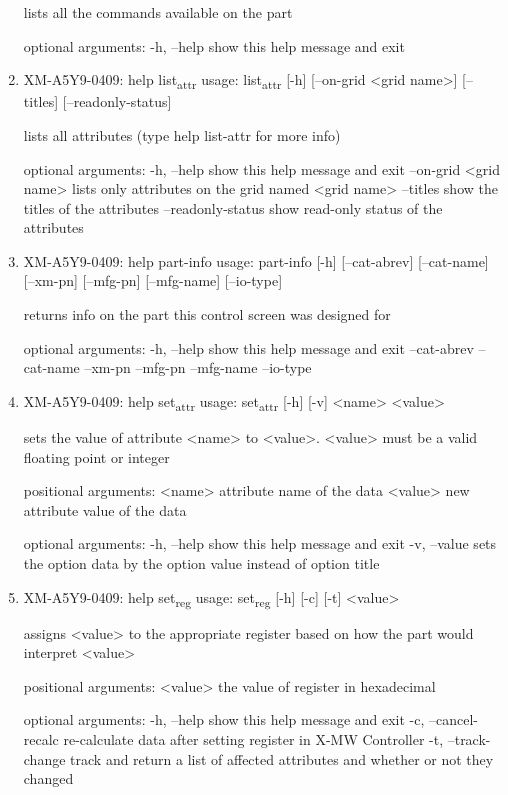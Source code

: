 \documentclass[11pt]{article}
\begin{document}
\begin{enumerate}
lists all the commands available on the part

optional arguments:
  -h, --help  show this help message and exit

\item XM-A5Y9-0409: help list\textsubscript{attr}
\label{sec:org9d9e451}
usage: list\textsubscript{attr} [-h] [--on-grid <grid name>] [--titles] [--readonly-status]

lists all attributes (type help list-attr for more info)

optional arguments:
  -h, --help            show this help message and exit
  --on-grid <grid name>
                        lists only attributes on the grid named <grid name>
  --titles              show the titles of the attributes
  --readonly-status     show read-only status of the attributes

\item XM-A5Y9-0409: help part-info
\label{sec:org0542f0c}
usage: part-info  [-h] [--cat-abrev] [--cat-name] [--xm-pn] [--mfg-pn] [--mfg-name]
        [--io-type]

returns info on the part this control screen was designed for

optional arguments:
  -h, --help   show this help message and exit
  --cat-abrev
  --cat-name
  --xm-pn
  --mfg-pn
  --mfg-name
  --io-type

\item XM-A5Y9-0409: help set\textsubscript{attr}
\label{sec:org537e80b}
usage: set\textsubscript{attr} [-h] [-v] <name> <value>

sets the value of attribute <name> to <value>. <value> must be a valid
floating point or integer

positional arguments:
  <name>       attribute name of the data
  <value>      new attribute value of the data

optional arguments:
  -h, --help   show this help message and exit
  -v, --value  sets the option data by the option value instead of option
               title

\item XM-A5Y9-0409: help set\textsubscript{reg}
\label{sec:org636a6bf}
usage: set\textsubscript{reg} [-h] [-c] [-t] <value>

assigns <value> to the appropriate register based on how the part would
interpret <value>

positional arguments:
  <value>              the value of register in hexadecimal

optional arguments:
  -h, --help           show this help message and exit
  -c, --cancel-recalc  re-calculate data after setting register in X-MW
                       Controller
  -t, --track-change   track and return a list of affected attributes and
                       whether or not they changed


\end{enumerate}
\end{document}
